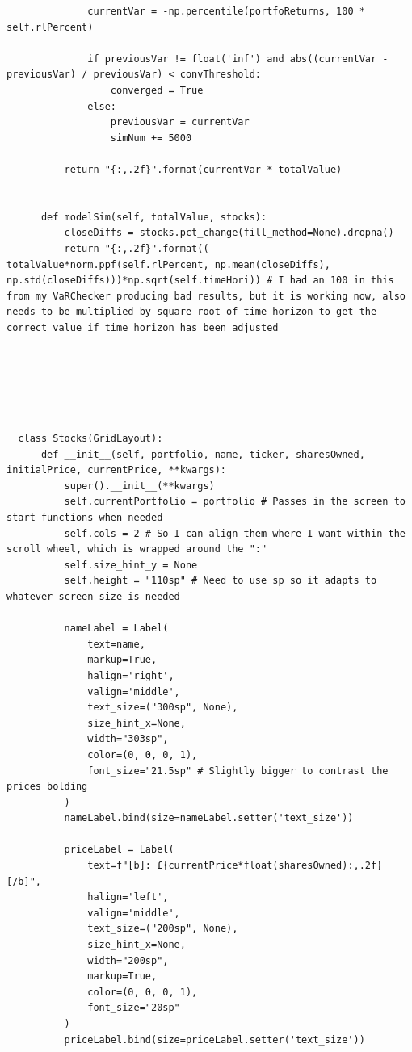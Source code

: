 \documentclass{article}
\begin{document}
\begin{verbatim}
              currentVar = -np.percentile(portfoReturns, 100 * self.rlPercent)

              if previousVar != float('inf') and abs((currentVar - previousVar) / previousVar) < convThreshold:
                  converged = True
              else:
                  previousVar = currentVar
                  simNum += 5000

          return "{:,.2f}".format(currentVar * totalValue)


      def modelSim(self, totalValue, stocks):
          closeDiffs = stocks.pct_change(fill_method=None).dropna()
          return "{:,.2f}".format((-totalValue*norm.ppf(self.rlPercent, np.mean(closeDiffs), np.std(closeDiffs)))*np.sqrt(self.timeHori)) # I had an 100 in this from my VaRChecker producing bad results, but it is working now, also needs to be multiplied by square root of time horizon to get the correct value if time horizon has been adjusted
      





  class Stocks(GridLayout):
      def __init__(self, portfolio, name, ticker, sharesOwned, initialPrice, currentPrice, **kwargs):
          super().__init__(**kwargs)
          self.currentPortfolio = portfolio # Passes in the screen to start functions when needed
          self.cols = 2 # So I can align them where I want within the scroll wheel, which is wrapped around the ":"
          self.size_hint_y = None
          self.height = "110sp" # Need to use sp so it adapts to whatever screen size is needed
          
          nameLabel = Label(
              text=name,
              markup=True,
              halign='right',
              valign='middle',
              text_size=("300sp", None), 
              size_hint_x=None,
              width="303sp",
              color=(0, 0, 0, 1),
              font_size="21.5sp" # Slightly bigger to contrast the prices bolding
          )
          nameLabel.bind(size=nameLabel.setter('text_size'))
          
          priceLabel = Label(
              text=f"[b]: £{currentPrice*float(sharesOwned):,.2f}[/b]",
              halign='left',
              valign='middle',
              text_size=("200sp", None),
              size_hint_x=None,
              width="200sp",
              markup=True,
              color=(0, 0, 0, 1),
              font_size="20sp"
          )
          priceLabel.bind(size=priceLabel.setter('text_size'))


\end{verbatim}
\end{document}
